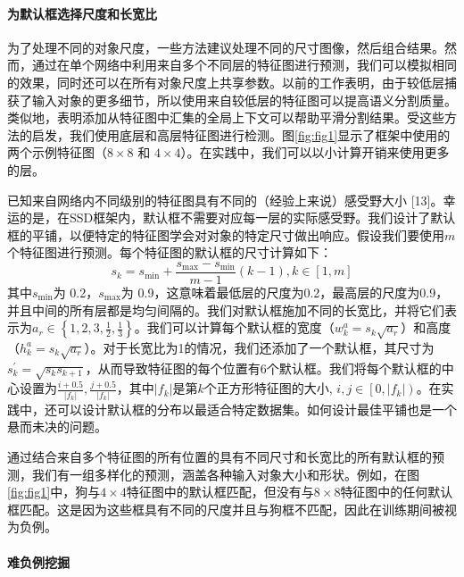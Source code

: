 \documentclass[../main.tex]{subfile}
\begin{document}
\paragraph{为默认框选择尺度和长宽比}

为了处理不同的对象尺度，一些方法\cite{overfeat, spp}建议处理不同的尺寸图像，然后组合结果。然而，通过在单个网络中利用来自多个不同层的特征图进行预测，我们可以模拟相同的效果，同时还可以在所有对象尺度上共享参数。以前的工作\cite{fcn}表明，由于较低层捕获了输入对象的更多细节，所以使用来自较低层的特征图可以提高语义分割质量。类似地，\cite{parsenet}表明添加从特征图中汇集的全局上下文可以帮助平滑分割结果。受这些方法的启发，我们使用底层和高层特征图进行检测。图\ref{fig:fig1}显示了框架中使用的两个示例特征图（$8\times 8$ 和 $4\times 4$）。在实践中，我们可以以小计算开销来使用更多的层。

已知来自网络内不同级别的特征图具有不同的（经验上来说）感受野大小 [13]。幸运的是，在SSD框架内，默认框不需要对应每一层的实际感受野。我们设计了默认框的平铺，以便特定的特征图学会对对象的特定尺寸做出响应。假设我们要使用$ m $个特征图进行预测。每个特征图的默认框的尺寸计算如下：
\begin{equation}
    s_k = s_\text{min} + \frac{s_\text{max} - s_\text{min}}{m - 1}\left(k-1\right), k\in\left[1, m\right]
\end{equation}
其中$ s_\text{min} $为 0.2，$s_\text{max}$为 0.9，这意味着最低层的尺度为0.2，最高层的尺度为0.9，并且中间的所有层都是均匀间隔的。我们对默认框施加不同的长宽比，并将它们表示为$a_r \in \left\{ 1, 2, 3, \frac{1}{2}, \frac{1}{3} \right\}$。我们可以计算每个默认框的宽度（$w_k^a = s_k \sqrt{a_r}$）和高度（$h_k^a = s_k\sqrt{a_r}$）。对于长宽比为1的情况，我们还添加了一个默认框，其尺寸为$s_k^\prime = \sqrt{s_ks_{k+1}}$，从而导致特征图的每个位置有6个默认框。我们将每个默认框的中心设置为$\frac{i+0.5}{\vert f_k \vert}, \frac{j+0.5}{\vert f_k \vert }$，其中$\vert f_k \vert$是第$ k $个正方形特征图的大小, $i, j\in \left[ 0, \vert f_k \vert \right)$。在实践中，还可以设计默认框的分布以最适合特定数据集。如何设计最佳平铺也是一个悬而未决的问题。

通过结合来自多个特征图的所有位置的具有不同尺寸和长宽比的所有默认框的预测，我们有一组多样化的预测，涵盖各种输入对象大小和形状。例如，在图\ref{fig:fig1}中，狗与$ 4\times 4 $特征图中的默认框匹配，但没有与$ 8\times 8 $特征图中的任何默认框匹配。这是因为这些框具有不同的尺度并且与狗框不匹配，因此在训练期间被视为负例。

\paragraph{难负例挖掘}
\end{document}
